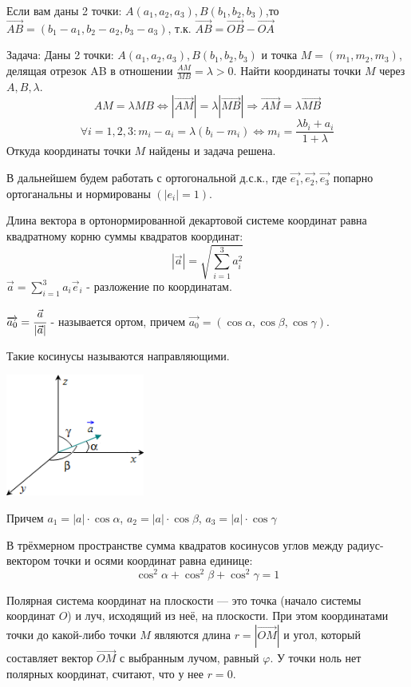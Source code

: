 Если вам даны 2 точки: \(A(a_1, a_2, a_3), B(b_1, b_2, b_3)\),то \(\overrightarrow{AB} = (b_1-a_1,b_2-a_2,b_3-a_3)\), т.к. \(\overrightarrow{AB}= \overrightarrow{OB} - \overrightarrow{OA}\) 

Задача: Даны 2 точки: \(A(a_1, a_2, a_3), B(b_1, b_2, b_3)\) и точка \(M = (m_1, m_2, m_3)\), делящая отрезок AB в отношении \(\frac{AM}{MB}=\lambda > 0\). Найти координаты точки \(M\) через \(A, B, \lambda\).
\[AM = \lambda MB \Leftrightarrow |\overrightarrow{AM}| = \lambda |\overrightarrow{MB}| \Rightarrow \overrightarrow{AM} = \lambda \overrightarrow{MB}\]
\[\forall i=1,2,3:m_i - a_i = \lambda (b_i - m_i) \Leftrightarrow m_i = \frac{\lambda b_i + a_i}{1 + \lambda}\]
Откуда координаты точки $M$ найдены и задача решена.

В дальнейшем будем работать с ортогональной д.с.к., где \(\vec{e_1},\vec{e_2},\vec{e_3}\) попарно ортоганальны и нормированы \((|e_i|=1)\).

Длина вектора в ортонормированной декартовой системе координат равна квадратному корню суммы квадратов координат:
\[|\vec a| = \sqrt{\sum\limits_{i=1}^3a_i^2}\]
\(\vec a = \sum\limits_{i=1}^3 a_i \vec e _i\) - разложение по координатам.

\(\overrightarrow{a_0} = \cfrac{\vec a}{|\vec a|}\) - называется ортом, причем $\overrightarrow{a_0} = (\cos \alpha, \cos \beta, \cos \gamma)$. 

Такие косинусы называются направляющими.

 \begin{center}
    \includegraphics[height=4cm]{Images/Chapter_1/1-2-2.png}
 \end{center}
 
Причем $a_1 = |a| \cdot \cos \alpha$, $a_2 = |a| \cdot \cos \beta$, $a_3 = |a| \cdot \cos \gamma$

В трёхмерном пространстве сумма квадратов косинусов углов между радиус-вектором точки и осями координат равна единице:
\[\cos^2 \alpha  + \cos^2 \beta  + \cos^2 \gamma =1\]


Полярная система координат на плоскости --- это точка (начало системы координат $O$) и луч, исходящий из неё, на плоскости. При этом координатами точки до какой-либо точки $M$ являются длина $r =|\overrightarrow{OM}|$ и угол, который составляет вектор $\overrightarrow{OM}$ с выбранным лучом, равный $\varphi$. У точки ноль нет полярных координат, считают, что у нее \(r=0\).

